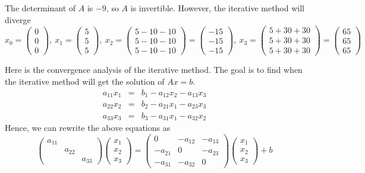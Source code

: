 The determinant of $A$ is $-9$, so $A$ is invertible. However, the iterative method will diverge 
\begin{equation*}
x_0 = 
\begin{pmatrix}
  0 \\ 0 \\ 0
\end{pmatrix},\
x_1 =
\begin{pmatrix}
  5\\ 5 \\ 5
\end{pmatrix},\
x_2 
= 
\begin{pmatrix}
5 - 10 - 10  \\
5 - 10 - 10  \\
5 - 10 - 10  
\end{pmatrix}
= 
\begin{pmatrix}
  -15 \\ -15 \\ -15
\end{pmatrix},\
    x_3 
=
\begin{pmatrix}
  5 + 30 + 30 \\
  5 + 30 + 30 \\
  5 + 30 + 30 
\end{pmatrix}
= 
\begin{pmatrix}
  65 \\ 65\\ 65
\end{pmatrix}
\end{equation*}

Here is the convergence analysis of the iterative method. The goal is to find when the iterative method will get the solution of $Ax = b$.
\begin{eqnarray*}
a_{11} x_1 &=& 
b_1 - a_{12}x_2 - a_{13}x_3\\
a_{22} x_2 &=& b_2 - a_{21}x_1 - a_{23}x_3\\
a_{33} x_3 &=& b_3 - a_{31}x_1 - a_{32}x_2
\end{eqnarray*}
Hence, we can rewrite the above equations as \begin{equation*}
  \begin{pmatrix}
    a_{11} && \\
& a_{22} & \\
&& a_{33}
  \end{pmatrix}
  \begin{pmatrix}
    x_1 \\ x_2 \\ x_3
  \end{pmatrix}
=
\begin{pmatrix}
  0 & -a_{12} & -a_{13} \\
 -a_{21} & 0 & -a_{23} \\
-a_{31} & -a_{32} & 0
\end{pmatrix}
  \begin{pmatrix}
    x_1 \\ x_2 \\ x_3
  \end{pmatrix}
 + b
\end{equation*}

